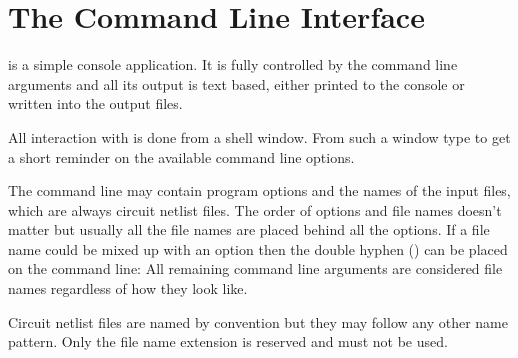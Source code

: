 \chapter{The Command Line Interface}

\linnet{} is a simple console application. It is fully controlled by the
command line arguments and all its output is text based, either printed
to the console or written into the output files.

All interaction with \linnet{} is done from a shell window. From such a
window type  to get a short reminder on the available
command line options.

The command line may contain program options and the names of the input
files, which are always circuit netlist files. The order of options and
file names doesn't matter but usually all the file names are placed behind
all the options. If a file name could be mixed up with an option then the
double hyphen (\code{--}) can be placed on the command line: All remaining
command line arguments are considered file names regardless of how they
look like.

Circuit netlist files are named  by convention but they may
follow any other name pattern. Only the file name extension 
is reserved and must not be used.

